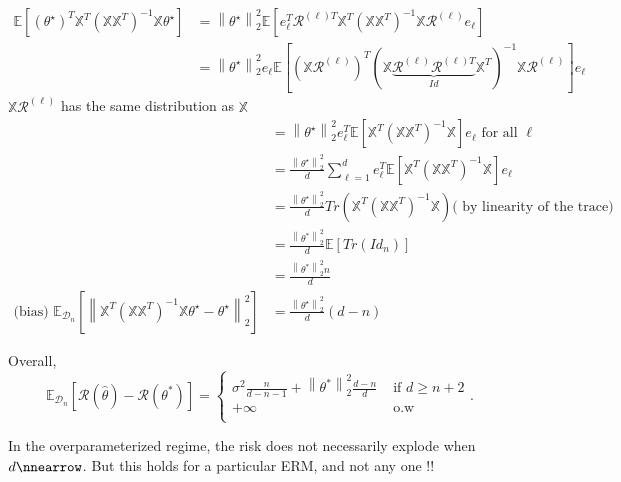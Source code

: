 \begin{itemize}
    \begin{align*}
        \mathbb{E}[ (\theta ^\star )^T \mathbb{X}^T (\mathbb{X} \mathbb{X}^T)^{-1} \mathbb{X} \theta ^\star ] 
            &= \left\| \theta ^\star  \right\| _2 ^2 \mathbb{E} [ e_\ell ^T \mathcal{R}^{(\ell ) T} \mathbb{X}^T (\mathbb{X} \mathbb{X}^T)^{-1} \mathbb{X} \mathcal{R}^{(\ell )} e_\ell ] \\
            &= \left\| \theta ^\star  \right\| _2 ^2 e_\ell \mathbb{E} [ (\mathbb{X} \mathcal{R}^{(\ell )})^T (\mathbb{X} \underbrace{\mathcal{R}^{(\ell )} \mathcal{R}^{(\ell )T}}_{Id} \mathbb{X}^T)^{-1} \mathbb{X} \mathcal{R}^{(\ell )}]e_\ell 
    \end{align*}
    $ \mathbb{X} \mathcal{R}^{(\ell )} $ has the same distribution as $ \mathbb{X} $ 
    \begin{align*}
        &= \left\| \theta ^\star  \right\| _2 ^2 e_\ell ^T \mathbb{E} [ \mathbb{X}^T (\mathbb{X} \mathbb{X}^T )^{-1} \mathbb{X}] e_\ell \text{ for all } \ell \\
        &= \frac{\left\| \theta ^\star  \right\| _2 ^2}{d} \sum_{\ell = 1}^{d} e_\ell ^T \mathbb{E} [ \mathbb{X}^T (\mathbb{X} \mathbb{X}^T)^{-1} \mathbb{X} ] e_\ell \\
        &= \frac{\left\| \theta ^\star  \right\| _2 ^2}{d} Tr (\mathbb{X}^T (\mathbb{X} \mathbb{X}^T)^{-1} \mathbb{X}) \text{( by linearity of the trace)} \\
        &= \frac{\left\| \theta ^\ast  \right\|^2_2 }{d} \mathbb{E}[Tr(Id_n)] \\
        &= \frac{\left\| \theta ^\ast  \right\|^2_2 n}{d} \\
    \text{(bias) } \mathbb{E}_{\mathcal{D}_n} [ \left\| \mathbb{X}^T (\mathbb{X} \mathbb{X}^T)^{-1} \mathbb{X} \theta ^\star - \theta ^\star  \right\| _2 ^2 ] 
        &= \frac{\left\| \theta ^\star  \right\| _2 ^2 }{d} (d - n)
    \end{align*}
\end{itemize}

Overall, 
\[
    \mathbb{E}_ {\mathcal{D}_n}[\mathcal{R}(\hat{\theta }) - \mathcal{R}(\theta ^\ast )] = \begin{cases}
        \sigma ^2 \frac{n}{d-n-1} + \left\| \theta ^\ast  \right\|^2_2 \frac{d-n}{d}  &\text{ if } d \geq n+2\\
        + \infty  &\text{ o.w}\\
    \end{cases} 
.\]

\begin{figure}[H] %
    \centering
\end{figure}

In the overparameterized regime, the risk does not necessarily explode when $ d \nnearrow$. But this holds for a particular ERM, and not any one !!